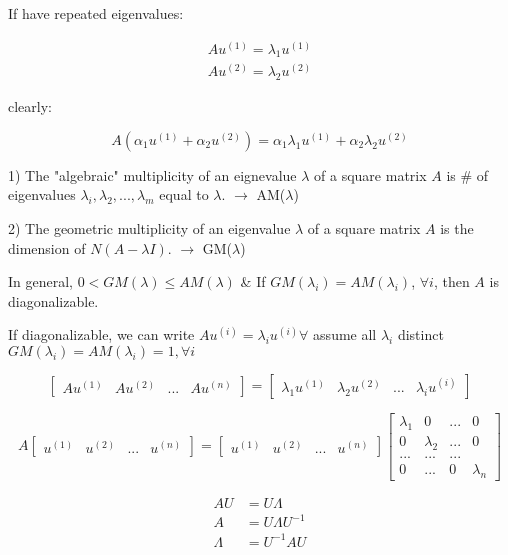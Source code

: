 If have repeated eigenvalues:

\begin{align*}
Au^{(1)} =\lambda_1u^{(1)}\\
Au^{(2)} =\lambda_2u^{(2)}
\end{align*}

clearly:

\begin{equation*}
A(\alpha_1u^{(1)} + \alpha_2u^{(2)}) = \alpha_1\lambda_1u^{(1)} + \alpha_2\lambda_2u^{(2)}
\end{equation*}

1) The "algebraic" multiplicity of an eignevalue $\lambda$ of a square matrix $A$ is \# of eigenvalues $\lambda_i, \lambda_2,...,\lambda_m$ equal to $\lambda$. $\rightarrow$ AM($\lambda$)

2) The geometric multiplicity of an eigenvalue $\lambda$ of a square matrix $A$ is the dimension of $N(A - \lambda I)$. $\rightarrow$ GM($\lambda$)

In general, $0 < GM(\lambda) \leq AM(\lambda)$ \& If $GM(\lambda_i) = AM(\lambda_i)$, $\forall i$, then $A$ is diagonalizable. 


If diagonalizable, we can write $Au^{(i)} = \lambda_iu^{(i)} \forall$ assume all $\lambda_i$ distinct $GM(\lambda_i) = AM(\lambda_i) = 1, \forall i$

$$
\left[
\begin{matrix}
Au^{(1)} & Au^{(2)} &... &Au^{(n)} 
\end{matrix}
\right] =
\left[
\begin{matrix}
\lambda_1u^{(1)} & \lambda_2u^{(2)}&... &\lambda_iu^{(i)}
\end{matrix}
\right]
$$

$$A
\left[
\begin{matrix}
u^{(1)} & u^{(2)} &... &u^{(n)} 
\end{matrix}
\right] =
\left[
\begin{matrix}
u^{(1)} & u^{(2)} &... &u^{(n)}
\end{matrix}
\right]
\left[
\begin{matrix}
\lambda_1 & 0 & ... & 0\\
0& \lambda_2  &  ... & 0\\
...  & ...  &   ...& \\
0    &  ... &  0 & \lambda_n
\end{matrix}
\right]
$$



\begin{align*}
AU &= U\Lambda\\
A &= U\Lambda U^{-1}\\
\Lambda &= U^{-1}AU
\end{align*}

